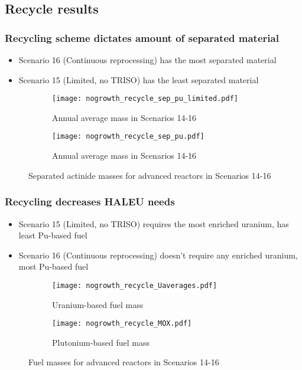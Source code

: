 \subsection{Recycle results}

\begin{frame}
    \frametitle{Recycling scheme dictates amount of separated material}
    \begin{itemize}
        \item Scenario 16 (Continuous reprocessing) has the 
              most separated material 
        \item Scenario 15 (Limited, no TRISO) has the least separated 
              material
    \end{itemize}
    \begin{figure}
        \centering
        \begin{subfigure}{0.48\textwidth}
            \texttt{[image: nogrowth\_recycle\_sep\_pu\_limited.pdf]}
            \caption{Annual average mass in Scenarios 14-16}
        \end{subfigure}
        \hfill
        \begin{subfigure}{0.48\textwidth}
            \texttt{[image: nogrowth\_recycle\_sep\_pu.pdf]}
            \caption{Annual average mass in Scenarios 14-16}
        \end{subfigure}
        \caption{Separated actinide masses for advanced reactors in Scenarios 14-16}
        \label{fig:recycle_sep_pu}
    \end{figure}
\end{frame}

\begin{frame}
    \frametitle{Recycling decreases HALEU needs}
    \begin{itemize}
        \item Scenario 15 (Limited, no TRISO) requires the most 
              enriched uranium, has least Pu-based fuel
        \item Scenario 16 (Continuous reprocessing) doesn't 
              require any enriched uranium, most Pu-based fuel
    \end{itemize}
    \begin{figure}
        \centering
        \begin{subfigure}{0.48\textwidth}
            \texttt{[image: nogrowth\_recycle\_Uaverages.pdf]}
            \caption{Uranium-based fuel mass}
        \end{subfigure}
        \hfill
        \begin{subfigure}{0.48\textwidth}
            \texttt{[image: nogrowth\_recycle\_MOX.pdf]}
            \caption{Plutonium-based fuel mass}
        \end{subfigure}
        \caption{Fuel masses for advanced reactors in Scenarios 14-16}
        \label{fig:recycle_fuel}
    \end{figure}
\end{frame}

